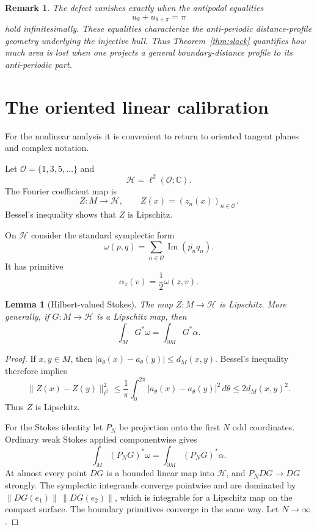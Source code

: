\documentclass[11pt]{article}
\newtheorem{lemma}[theorem]{Lemma}
\newtheorem{remark}[theorem]{Remark}
\newcommand{\C}{\mathbb C}
\begin{document}
\begin{remark}
The defect vanishes exactly when the antipodal equalities
\[
        u_\theta+u_{\theta+\pi}=\pi
\]
hold infinitesimally.  These equalities characterize the anti-periodic
distance-profile geometry underlying the injective hull.  Thus
Theorem~\ref{thm:slack} quantifies how much area is lost when one projects a
general boundary-distance profile to its anti-periodic part.
\end{remark}

\section{The oriented linear calibration}

For the nonlinear analysis it is convenient to return to oriented tangent
planes and complex notation.

Let $\mathcal O=\{1,3,5,\ldots\}$ and
\[
        \mathcal H=\ell^2(\mathcal O;\C).
\]
The Fourier coefficient map is
\[
        Z:M\to\mathcal H,\qquad
        Z(x)=(z_n(x))_{n\in\mathcal O}.
\]
Bessel's inequality shows that $Z$ is Lipschitz.

On $\mathcal H$ consider the standard symplectic form
\[
        \omega(p,q)
        =\sum_{n\in\mathcal O}\operatorname{Im}
          (\overline{p_n}q_n).
\]
It has primitive
\[
        \alpha_z(v)=\frac12\omega(z,v).
\]

\begin{lemma}[Hilbert-valued Stokes]\label{lem:Hilbert-Stokes}
The map $Z:M\to\mathcal H$ is Lipschitz.  More generally, if
$G:M\to\mathcal H$ is a Lipschitz map, then
\[
        \int_M G^*\omega=\int_{\partial M}G^*\alpha.
\]
\end{lemma}

\begin{proof}
If $x,y\in M$, then
$|a_\theta(x)-a_\theta(y)|\le d_M(x,y)$.  Bessel's inequality therefore
implies
\[
 \|Z(x)-Z(y)\|_{\ell^2}^2
 \le\frac1\pi\int_0^{2\pi}
       |a_\theta(x)-a_\theta(y)|^2\,d\theta
 \le2d_M(x,y)^2.
\]
Thus $Z$ is Lipschitz.

For the Stokes identity let $P_N$ be projection onto the first $N$ odd
coordinates.  Ordinary weak Stokes applied componentwise gives
\[
 \int_M(P_NG)^*\omega
 =\int_{\partial M}(P_NG)^*\alpha.
\]
At almost every point $DG$ is a bounded linear map into $\mathcal H$, and
$P_NDG\to DG$ strongly.  The symplectic integrands converge pointwise and
are dominated by
$\|DG(e_1)\|\,\|DG(e_2)\|$, which is integrable for a Lipschitz map on the
compact surface.  The boundary primitives converge in the same way.  Let
$N\to\infty$.
\end{proof}
\end{document}
